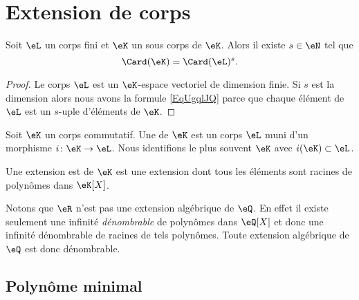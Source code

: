
\section{Extension de corps}
\label{SECooLQVJooTGeqiR}

\begin{lemma}       \label{LemobATFP}
    Soit \( \eL\) un corps fini et \( \eK\) un sous corps de \( \eK\). Alors il existe \( s\in \eN\) tel que
    \begin{equation}        \label{EqUgqlJQ}
        \Card(\eK)=\Card(\eL)^s.
    \end{equation}
\end{lemma}

\begin{proof}
    Le corps \( \eL\) est un \( \eK\)-espace vectoriel de dimension finie. Si \( s\) est la dimension alors nous avons la formule \eqref{EqUgqlJQ} parce que chaque élément de \( \eL\) est un \( s\)-uple d'éléments de \( \eK\).
\end{proof}

\begin{definition}      \label{DEFooFLJJooGJYDOe}
    Soit \( \eK\) un corps commutatif. Une  de \( \eK\) est un corps \( \eL\) muni d'un morphisme \( i\colon \eK\to \eL\). Nous identifions le plus souvent \( \eK\) avec \( i(\eK)\subset \eL\).

    Une extension est  de \( \eK\) est une extension dont tous les éléments sont racines de polynômes dans \( \eK[X]\).
\end{definition}
Notons que \( \eR\) n'est pas une extension algébrique de \( \eQ\). En effet il existe seulement une infinité \emph{dénombrable} de polynômes dans \( \eQ[X]\) et donc une infinité dénombrable de racines de tels polynômes. Toute extension algébrique de \( \eQ\) est donc dénombrable.

\subsection{Polynôme minimal}


